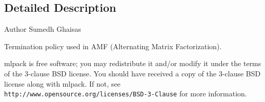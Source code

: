 \subsection{Detailed Description}
\begin{DoxyAuthor}{Author}
Sumedh Ghaisas
\end{DoxyAuthor}
Termination policy used in A\+MF (Alternating Matrix Factorization).

mlpack is free software; you may redistribute it and/or modify it under the terms of the 3-\/clause B\+SD license. You should have received a copy of the 3-\/clause B\+SD license along with mlpack. If not, see {\tt http\+://www.\+opensource.\+org/licenses/\+B\+S\+D-\/3-\/\+Clause} for more information. 